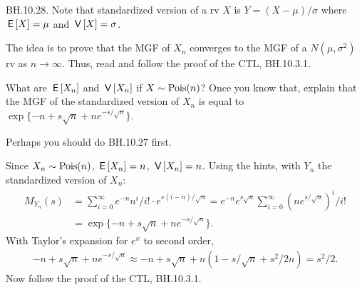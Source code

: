 \begin{exercise}
BH.10.28. Note that standardized version of a rv $X$ is $Y=(X-\mu)/\sigma$ where $\,\mathsf{E}\left[X\right] = \mu$ and $\,\mathsf{V}\left[X\right] = \sigma$.
\begin{hint}
The idea is to prove that the MGF of $X_n$ converges to the MGF of a $N(\mu, \sigma^{2})$ rv as $n\to\infty$. Thus, read and follow the proof of the CTL, BH.10.3.1.

What are  $\,\mathsf{E}\left[X_n\right]$ and $\,\mathsf{V}\left[X_n\right]$ if $X\sim \mathrm{Pois}(n)$?  Once you know that, explain that the MGF of the standardized version of $X_n$ is equal to  $\exp\{-n+s \sqrt n + n e^{-s/\sqrt n}\}$.

Perhaps you should do BH.10.27 first.
\end{hint}
\begin{solution}
Since $X_n\sim \mathrm{Pois}(n)$, $\,\mathsf{E}\left[X_n\right]=n$, $\,\mathsf{V}\left[X_n\right]=n$. Using the hints, with $Y_{n}$ the standardized version of $X_n$:
\begin{align*}
M_{Y_n}(s) &= \sum_{i=0}^{\infty} e^{-n} n^i/i!\cdot e^{s (i-n)/\sqrt n}
= e^{-n} e^{s\sqrt n} \sum_{i=0}^{\infty}  (ne^{s/\sqrt n})^i/i!\\
&= \exp\{-n+s \sqrt n + n e^{-s/\sqrt n}\}.
\end{align*}
With Taylor's expansion for $e^x$ to second order,
\begin{align*}
-n+s \sqrt n + n e^{-s/\sqrt n} \approx -n+s \sqrt n + n \left(1 -s/\sqrt n + s^{2}/2 n\right) =   s^2/2.
\end{align*}
Now follow the proof of the CTL, BH.10.3.1.
\end{solution}
\end{exercise}


